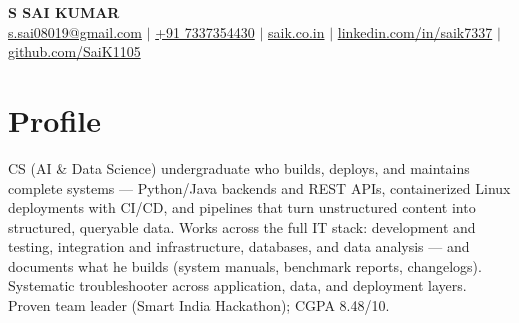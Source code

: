 \documentclass[10pt,a4paper]{article}
\begin{document}
\begin{center}
{\LARGE\bfseries S SAI KUMAR}\\[1.2mm]
{\footnotesize \href{mailto:s.sai08019@gmail.com}{s.sai08019@gmail.com} $\mid$ \href{tel:+917337354430}{+91 7337354430} $\mid$ \href{https://saik.co.in}{saik.co.in} $\mid$ \href{https://linkedin.com/in/saik7337}{linkedin.com/in/saik7337} $\mid$ \href{https://github.com/SaiK1105}{github.com/SaiK1105}}
\end{center}
\vspace{-2mm}

\section{Profile}
{\small CS (AI \& Data Science) undergraduate who builds, deploys, and maintains complete systems --- Python/Java backends and REST APIs, containerized Linux deployments with CI/CD, and pipelines that turn unstructured content into structured, queryable data. Works across the full IT stack: development and testing, integration and infrastructure, databases, and data analysis --- and documents what he builds (system manuals, benchmark reports, changelogs). Systematic troubleshooter across application, data, and deployment layers. Proven team leader (Smart India Hackathon); CGPA 8.48/10.}
\end{document}
